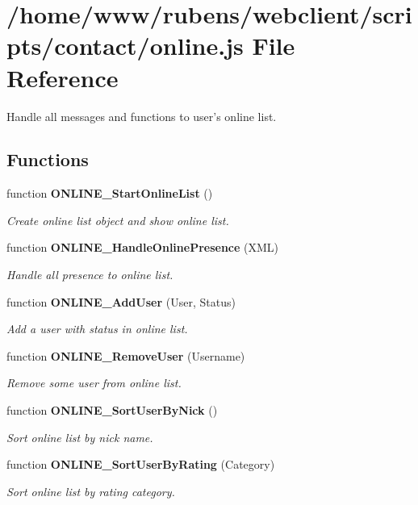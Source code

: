\section{/home/www/rubens/webclient/scripts/contact/online.js File Reference}
\label{online_8js}
Handle all messages and functions to user's online list. 

\subsection*{Functions}
\begin{CompactItemize}
\item 
function {\bf ONLINE\_\-StartOnlineList} ()
\begin{CompactList}\small\item\em Create online list object and show online list. \item\end{CompactList}\item 
function {\bf ONLINE\_\-HandleOnlinePresence} (XML)
\begin{CompactList}\small\item\em Handle all presence to online list. \item\end{CompactList}\item 
function {\bf ONLINE\_\-AddUser} (User, Status)
\begin{CompactList}\small\item\em Add a user with status in online list. \item\end{CompactList}\item 
function {\bf ONLINE\_\-RemoveUser} (Username)
\begin{CompactList}\small\item\em Remove some user from online list. \item\end{CompactList}\item 
function {\bf ONLINE\_\-SortUserByNick} ()
\begin{CompactList}\small\item\em Sort online list by nick name. \item\end{CompactList}\item 
function {\bf ONLINE\_\-SortUserByRating} (Category)
\begin{CompactList}\small\item\em Sort online list by rating category. \item\end{CompactList}\end{CompactItemize}


